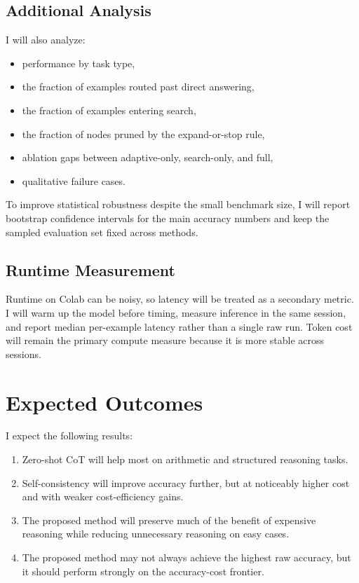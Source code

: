 \documentclass[10pt]{article}
\begin{document}
\subsection{Additional Analysis}
I will also analyze:
\begin{itemize}[leftmargin=1.2em,itemsep=0.08em]
    \item performance by task type,
    \item the fraction of examples routed past direct answering,
    \item the fraction of examples entering search,
    \item the fraction of nodes pruned by the expand-or-stop rule,
    \item ablation gaps between adaptive-only, search-only, and full,
    \item qualitative failure cases.
\end{itemize}
To improve statistical robustness despite the small benchmark size, I will report bootstrap confidence intervals for the main accuracy numbers and keep the sampled evaluation set fixed across methods.

\subsection{Runtime Measurement}
Runtime on Colab can be noisy, so latency will be treated as a secondary metric. I will warm up the model before timing, measure inference in the same session, and report median per-example latency rather than a single raw run. Token cost will remain the primary compute measure because it is more stable across sessions.

\section{Expected Outcomes}
I expect the following results:
\begin{enumerate}[leftmargin=1.3em,itemsep=0.10em]
    \item Zero-shot CoT will help most on arithmetic and structured reasoning tasks.
    \item Self-consistency will improve accuracy further, but at noticeably higher cost and with weaker cost-efficiency gains.
    \item The proposed method will preserve much of the benefit of expensive reasoning while reducing unnecessary reasoning on easy cases.
    \item The proposed method may not always achieve the highest raw accuracy, but it should perform strongly on the accuracy-cost frontier.
\end{enumerate}
\end{document}
